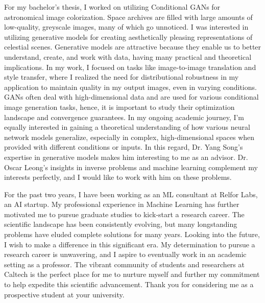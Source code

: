 \documentclass{article}
\begin{document}
\hspace{0.25in}For my bachelor's thesis, I worked on utilizing Conditional GANs
for astronomical image colorization. Space archives are filled with large
amounts of low-quality, greyscale images, many of which go unnoticed. I was
interested in utilizing generative models for creating aesthetically pleasing
representations of celestial scenes. Generative models are attractive because
they enable us to better understand, create, and work with data, having many
practical and theoretical implications. In my work, I focused on tasks like
image-to-image translation and style transfer, where I realized the need for
distributional robustness in my application to maintain quality in my output
images, even in varying conditions. GANs often deal with high-dimensional data
and are used for various conditional image generation tasks, hence, it is
important to study their optimization landscape and convergence guarantees. In
my ongoing academic journey, I'm equally interested in gaining a theoretical
understanding of how various neural network models generalize, especially in
complex, high-dimensional spaces when provided with different conditions or
inputs. In this regard, Dr. Yang Song's expertise in generative models makes him
interesting to me as an advisor. Dr. Oscar Leong's insights in inverse problems
and machine learning complement my interests perfectly, and I would like to work
with him on these problems.  \vspace{5pt}

\hspace{0.25in}For the past two years, I have been working as an ML consultant
at Relfor Labs, an AI startup. My professional experience in Machine Learning
has further motivated me to pursue graduate studies to kick-start a research
career. The scientific landscape has been consistently evolving, but many
longstanding problems have eluded complete solutions for many years. Looking
into the future, I wish to make a difference in this significant era. My
determination to pursue a research career is unwavering, and I aspire to
eventually work in an academic setting as a professor. The vibrant community of
students and researchers at Caltech is the perfect place for me to nurture
myself and further my commitment to help expedite this scientific advancement.
Thank you for considering me as a prospective student at your university.
\end{document}
